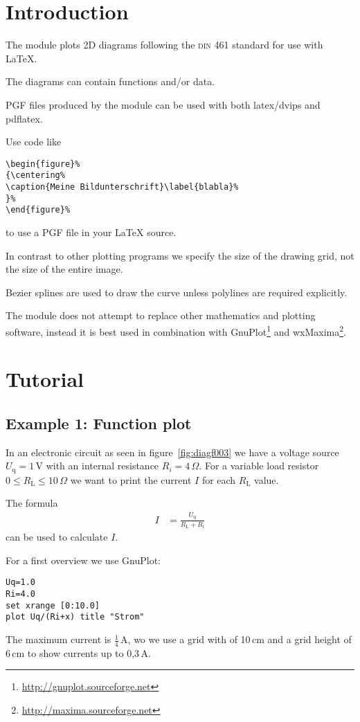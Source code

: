 \documentclass[origlongtable]{scrartcl}
\author{Dipl.-Ing.~D.~Krause}
\title{\resizebox{10cm}{!}{LaTeX::PGF::Diagram2D}}
\begin{document}
\startofdocument
\section{Introduction}
The module plots 2D diagrams following the \textsc{din} 461 standard
for use with \LaTeX{}.

The diagrams can contain functions and/or data.

PGF files produced by the module can be used with both latex/dvips
and pdflatex.

Use code like
\begin{lstlisting}
\begin{figure}%
{\centering%
\caption{Meine Bildunterschrift}\label{blabla}%
}%
\end{figure}%
\end{lstlisting}
to use a PGF file in your \LaTeX{} source.

In contrast to other plotting programs we specify the size of the
drawing grid, not the size of the entire image.

Bezier splines are used to draw the curve unless polylines are
required explicitly.

The module does not attempt to replace other mathematics and
plotting software, instead it is best used in combination
with
GnuPlot\footnote{\url{http://gnuplot.sourceforge.net}}
and
wxMaxima\footnote{\url{http://maxima.sourceforge.net}}.

\clearpage
\section{Tutorial}
\subsection[Function]{Example 1: Function plot}

In an electronic circuit as seen in figure~\vref{fig:diagf003}
we have a voltage source \(U_{\text{q}}=1\,\text{V}\) with an internal resistance
\(R_{i}=4\,\Omega\). For a variable load resistor
\(0\leq R_{\text{L}}\leq 10\,\Omega\) we want to print the current
\(I\) for each \(R_{\text{L}}\) value.

The formula
\begin{align*}I&=\frac{U_{\text{q}}}{R_{\text{L}}+R_{\text{i}}}\end{align*}
can be used to calculate \(I\).

For a first overview we use GnuPlot:
\begin{lstlisting}[language=GnuPlot]
Uq=1.0
Ri=4.0
set xrange [0:10.0]
plot Uq/(Ri+x) title "Strom"
\end{lstlisting}
The maximum current is \(\tfrac{1}{4}\,\text{A}\), wo we use a grid with
of 10\,cm and a grid height of 6\,cm to show currents up to 0,3\,A.
\end{document}
